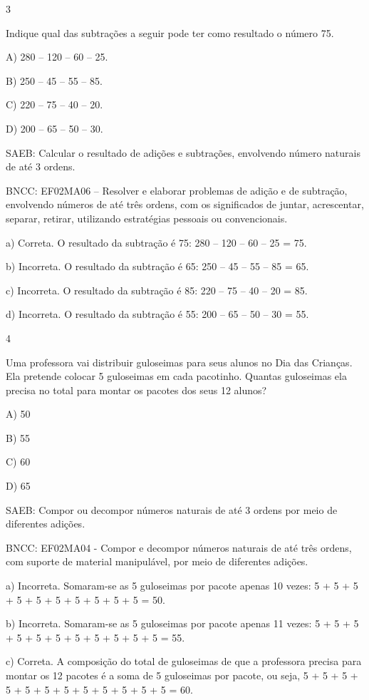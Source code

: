 \begin{escolha}
\begin{escolha}
{{{{\num{3}

Indique qual das subtrações a seguir pode ter como resultado o número 75.

A) 280 -- 120 -- 60 -- 25.

B) 250 -- 45 -- 55 -- 85.

C) 220 -- 75 -- 40 -- 20.

D) 200 -- 65 -- 50 -- 30.

SAEB: Calcular o resultado de adições e subtrações, envolvendo
número naturais de até 3 ordens.

BNCC: EF02MA06 -- Resolver e elaborar problemas de adição e de subtração,
envolvendo números de até três ordens, com os significados de juntar,
acrescentar, separar, retirar, utilizando estratégias pessoais ou convencionais.

a) Correta. O resultado da subtração é 75: 280 -- 120 -- 60 -- 25 = 75.

b) Incorreta. O resultado da subtração é 65: 250 -- 45 -- 55 -- 85 = 65.

c) Incorreta. O resultado da subtração é 85: 220 -- 75 -- 40 -- 20 = 85.

d) Incorreta. O resultado da subtração é 55: 200 -- 65 -- 50 -- 30 = 55.

\num{4}

Uma professora vai distribuir guloseimas para seus alunos no Dia das
Crianças. Ela pretende colocar 5 guloseimas em cada pacotinho. Quantas
guloseimas ela precisa no total para montar os pacotes dos seus 12
alunos?

A) 50

B) 55

C) 60

D) 65

SAEB: Compor ou decompor números naturais de até 3 ordens por meio de diferentes adições.

BNCC: EF02MA04 - Compor e decompor números naturais de até três ordens,
com suporte de material manipulável, por meio de diferentes adições.

a) Incorreta. Somaram-se as 5 guloseimas por pacote apenas 10 vezes: 5 + 5 +
5 + 5 + 5 + 5 + 5 + 5 + 5 + 5 = 50.

b) Incorreta. Somaram-se as 5 guloseimas por pacote apenas 11 vezes: 5 + 5 +
5 + 5 + 5 + 5 + 5 + 5 + 5 + 5 + 5 = 55.

c) Correta. A composição do total de guloseimas de que a professora precisa
para montar os 12 pacotes é a soma de 5 guloseimas por pacote, ou seja,
5 + 5 + 5 + 5 + 5 + 5 + 5 + 5 + 5 + 5 + 5 + 5 = 60.

}}}}
\end{escolha}
\end{escolha}
